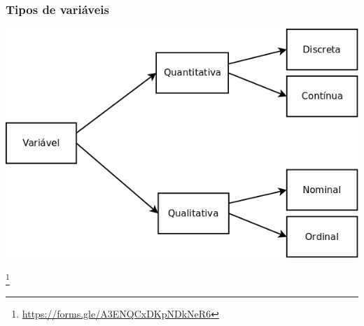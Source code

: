 \documentclass[11pt]{beamer}
\newcommand\blfootnote[1]{%
  \begingroup
  \renewcommand\thefootnote{}\footnote{#1}%
  \addtocounter{footnote}{-1}%
  \endgroup
}
\begin{document}
\begin{frame}
\frametitle{Tipos de variáveis}

\begin{center}\includegraphics[width=0.85\linewidth]{figs/classificacao_variaveis} \end{center}
\blfootnote{\url{https://forms.gle/A3ENQCxDKpNDkNeR6}}
\end{frame}
\end{document}
